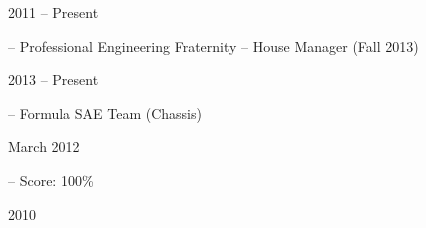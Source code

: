 

\flushleft \begin{minipage}[t]{\dateColWidth}
2011 -- Present
\end{minipage}
\begin{minipage}[t]{0.8\textwidth}
 -- Professional Engineering Fraternity -- House Manager (Fall 2013)
\end{minipage}

\flushleft \begin{minipage}[t]{\dateColWidth}
2013 -- Present
\end{minipage}
\begin{minipage}[t]{0.8\textwidth}
 -- Formula SAE Team (Chassis)
\end{minipage}

\flushleft \begin{minipage}[t]{\dateColWidth}
March 2012
\end{minipage}
\begin{minipage}[t]{0.8\textwidth}
 -- Score: 100\%
\end{minipage}

\flushleft \begin{minipage}[t]{\dateColWidth}
2010
\end{minipage}
\begin{minipage}[t]{0.8\textwidth}
\end{minipage}













